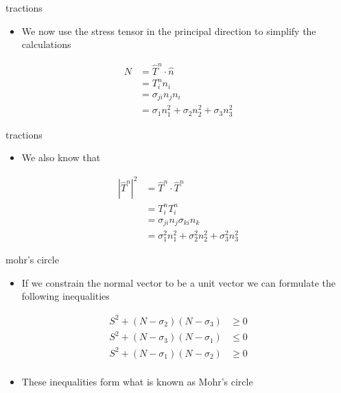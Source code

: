 \documentclass[
  letterpaper,
  ignorenonframetext,
  aspectratio=43,
  handout,
  12pt]{beamer}
\providecommand{\tightlist}{%
  \setlength{\itemsep}{0pt}\setlength{\parskip}{0pt}}
\providecommand{\tightlist}{%
\setlength{\itemsep}{0pt}\setlength{\parskip}{0pt}}
\begin{document}
\begin{frame}{tractions}
\protect\hypertarget{tractions-2}{}
\begin{itemize}
\tightlist
\item
  We now use the stress tensor in the principal direction to simplify
  the calculations
\end{itemize}

\[\begin{aligned}
    N &= \hat{T}^n \cdot \hat{n}\\
    &= T^n_i n_i \\
    &= \sigma_{ji} n_j n_i\\
    &= \sigma_1 n_1^2 + \sigma_2 n_2^2 + \sigma_3 n_3^2
\end{aligned}\]
\end{frame}

\begin{frame}{tractions}
\protect\hypertarget{tractions-3}{}
\begin{itemize}
\tightlist
\item
  We also know that
\end{itemize}

\[\begin{aligned}
    |\hat{T}^n|^2 &= \hat{T}^n \cdot \hat{T}^n\\
    &= T_i^n T_i^n \\
    &= \sigma_{ji} n_j \sigma_{ki} n_k\\
    &= \sigma_1^2 n_1^2 + \sigma_2^2 n_2^2 + \sigma_3^2 n_3^2
\end{aligned}\]
\end{frame}

\begin{frame}{mohr's circle}
\protect\hypertarget{mohrs-circle}{}
\begin{itemize}
\tightlist
\item
  If we constrain the normal vector to be a unit vector we can formulate
  the following inequalities
\end{itemize}

\[\begin{aligned}
    S^2 + (N-\sigma_2)(N-\sigma_3) &\ge 0\\
    S^2 + (N-\sigma_3)(N-\sigma_1) &\le 0\\
    S^2 + (N-\sigma_1)(N-\sigma_2) &\ge 0\\
\end{aligned}\]

\begin{itemize}
\tightlist
\item
  These inequalities form what is known as Mohr's circle
\end{itemize}
\end{frame}
\end{document}
